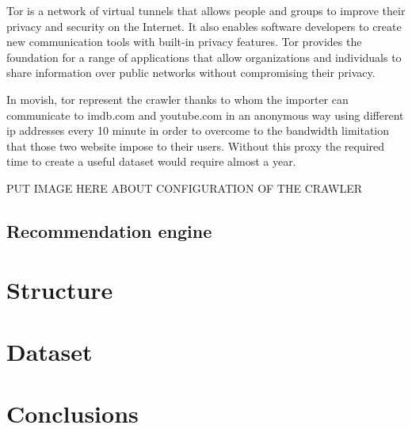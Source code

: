 Tor \cite{tor} is a network of virtual tunnels that allows people and groups to improve their privacy and security on the Internet. It also enables software developers to create new communication tools with built-in privacy features. Tor provides the foundation for a range of applications that allow organizations and individuals to share information over public networks without compromising their privacy.

In movish, tor represent the crawler thanks to whom the importer can communicate to imdb.com and youtube.com in an anonymous way using different ip addresses every 10 minute in order to overcome to the bandwidth limitation that those two website impose to their users. Without this proxy the required time to create a useful dataset would require almost a year.

PUT IMAGE HERE ABOUT CONFIGURATION OF THE CRAWLER

\subsection{Recommendation engine}
\label{sec:recommendation_engine}

\section{Structure}
\label{sec:structure}

\section{Dataset}
\label{sec:dataset}

\section{Conclusions}
\label{sec:movish_system_conclusions}


\acresetall